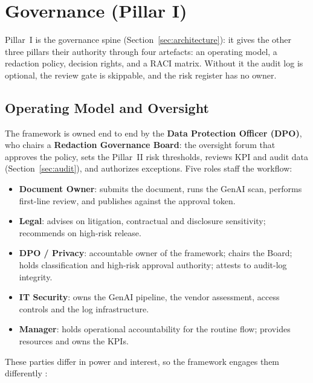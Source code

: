 \documentclass[12pt,a4paper]{article}
\begin{document}
\section{Governance (Pillar I)}
\label{sec:governance}

Pillar~I is the governance spine (Section~\ref{sec:architecture}): it gives the other three pillars their authority through four artefacts: an operating model, a redaction policy, decision rights, and a RACI matrix. Without it the audit log is optional, the review gate is skippable, and the risk register has no owner.

\subsection{Operating Model and Oversight}

The framework is owned end to end by the \textbf{Data Protection Officer (DPO)}, who chairs a \textbf{Redaction Governance Board}: the oversight forum that approves the policy, sets the Pillar~II risk thresholds, reviews KPI and audit data (Section~\ref{sec:audit}), and authorizes exceptions. Five roles staff the workflow:

\begin{definitionbox}
\begin{itemize}
  \item \textbf{Document Owner}: submits the document, runs the GenAI scan, performs first-line review, and publishes against the approval token.
  \item \textbf{Legal}: advises on litigation, contractual and disclosure sensitivity; recommends on high-risk release.
  \item \textbf{DPO / Privacy}: accountable owner of the framework; chairs the Board; holds classification and high-risk approval authority; attests to audit-log integrity.
  \item \textbf{IT Security}: owns the GenAI pipeline, the vendor assessment, access controls and the log infrastructure.
  \item \textbf{Manager}: holds operational accountability for the routine flow; provides resources and owns the KPIs.
\end{itemize}
\end{definitionbox}

These parties differ in power and interest, so the framework engages them differently \cite{falchi_slides}:
\end{document}
